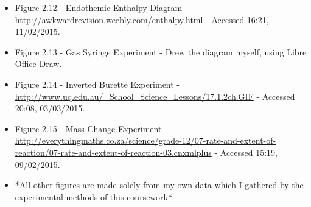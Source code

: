 \begin{itemize}
\item Figure 2.12 - Endothemic Enthalpy Diagram - \url{http://awkwardrevision.weebly.com/enthalpy.html} - Accessed 16:21, 11/02/2015.



\item Figure 2.13 - Gas Syringe Experiment - Drew the diagram myself, using Libre Office Draw.

\item Figure 2.14 - Inverted Burette Experiment - \url{http://www.uq.edu.au/_School_Science_Lessons/17.1.2ch.GIF} - Accessed 20:08, 03/03/2015.

\item Figure 2.15 - Mass Change Experiment - \url{http://everythingmaths.co.za/science/grade-12/07-rate-and-extent-of-reaction/07-rate-and-extent-of-reaction-03.cnxmlplus} - Accessed 15:19, 09/02/2015.



\item *All other figures are made solely from my own data which I gathered by the experimental methods of this coursework*









\end{itemize}